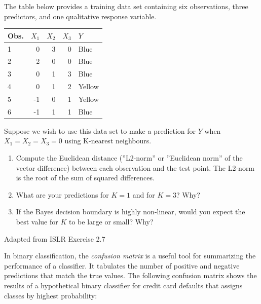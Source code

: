 \begin{exerciseboxpaper}
The table below provides a training data set containing six observations, three predictors, and one qualitative response variable.\\ 
\vspace{.5\baselineskip}
\begin{center}
\footnotesize
\renewcommand{\arraystretch}{1.25}
\begin{tabular}{l|r|r|r|l} \hline
Obs. & $X_1$ & $X_2$ & $X_3$ & $Y$ \\ \hline
1 & 0 & 3 & 0 & Blue \\
2 & 2 & 0 & 0 & Blue \\
3 & 0 & 1 & 3 & Blue \\
4 & 0 & 1 & 2 & Yellow \\
5 & -1 & 0 & 1 & Yellow \\
6 & -1 & 1 & 1 & Blue \\ \hline
\end{tabular}
\end{center}

\vspace{.5\baselineskip}
Suppose we wish to use this data set to make a prediction for $Y$ when $X_1=X_2=X_3=0$ using K-nearest neighbours.
\vspace{.5\baselineskip}
\begin{enumerate}
  \item Compute the Euclidean distance (''L2-norm'' or ''Euclidean norm'' of the vector difference) between each observation and the test point. The L2-norm is the root of the sum of squared differences.
  \item What are your predictions for $K=1$ and for $K=3$? Why?
  \item If the Bayes decision boundary is highly non-linear, would you expect the best value for $K$ to be large or small? Why?
\end{enumerate}

\vspace{.5\baselineskip}\scriptsize Adapted from ISLR Exercise 2.7
\end{exerciseboxpaper}

In binary classification, the \emph{confusion matrix} is a useful tool for summarizing the performance of a classifier. It tabulates the number of positive and negative predictions that match the true values. The following confusion matrix shows the results of a hypothetical binary classifier for credit card defaults that assigns classes by highest probability:

